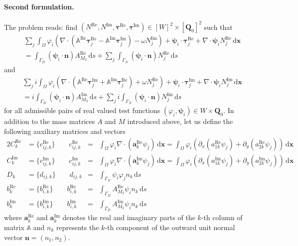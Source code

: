 \documentclass[11pt,a4paper]{article}
\begin{document}
\paragraph{Second formulation.} The problem reads: find $(N^\mathrm{Re},N^\mathrm{Im},\boldsymbol{\tau}^\mathrm{Re},\boldsymbol{\tau}^\mathrm{Im})\in [W]^2\times [\mathbf{Q}_0]^2$ such that
\begin{align}
&\sum_j\int_\Omega \varphi_i\left(\nabla\cdot(\mathbb{A}^\mathrm{Re}\boldsymbol{\tau}_j^\mathrm{Re}-\mathbb{A}^\mathrm{Im}\boldsymbol{\tau}_j^\mathrm{Im})-\omega N^\mathrm{Im}_j\right)+
\boldsymbol{\psi}_i\cdot\boldsymbol{\tau}^\mathrm{Re}_j+
\nabla\cdot\boldsymbol{\psi}_iN^\mathrm{Re}_j
\,\mathrm{d}\mathbf{x}\\
&=
\int_{\Gamma_D}(\boldsymbol{\psi}_i\cdot\mathbf{n})A^\mathrm{Re}_{M_2}\,\mathrm{d}s
+
\sum_j\int_{\Gamma_N}(\boldsymbol{\psi}_i\cdot\mathbf{n})N^\mathrm{Re}_j\,\mathrm{d}s
\end{align}
and
\begin{align}
&\sum_ji\int_\Omega \varphi_i\left(\nabla\cdot(\mathbb{A}^\mathrm{Re}\boldsymbol{\tau}_j^\mathrm{Im}+\mathbb{A}^\mathrm{Im}\boldsymbol{\tau}_j^\mathrm{Re})+\omega N^\mathrm{Re}_j\right)+
\boldsymbol{\psi}_i\cdot\boldsymbol{\tau}^\mathrm{Im}_j+
\nabla\cdot\boldsymbol{\psi}_iN^\mathrm{Im}_j
\,\mathrm{d}\mathbf{x}\\
&=
i\int_{\Gamma_D}(\boldsymbol{\psi}_i\cdot\mathbf{n})A^\mathrm{Im}_{M_2}\,\mathrm{d}s
+
\sum_ji\int_{\Gamma_N}(\boldsymbol{\psi}_i\cdot\mathbf{n})N^\mathrm{Im}_j\,\mathrm{d}s
\end{align}
for all admissible pairs of real valued test functions $(\varphi_i,\boldsymbol{\psi}_i)\in W\times\mathbf{Q}_0$.
In addition to the mass matrices $A$ and $M$ introduced above, let us define the following auxiliary matrices and vectors
\begin{alignat}{2}
C^\mathrm{Re}_k&=\{c^\mathrm{Re}_{ij,k}\} \qquad c^\mathrm{Re}_{ij,k}&=&
\int_\Omega \varphi_i\nabla\cdot(\mathbf{a}^\mathrm{Re}_k\psi_j)\,\mathrm{d}\mathbf{x}
=
\int_\Omega \varphi_i\left(\partial_x(a^\mathrm{Re}_{1k}\psi_j)+\partial_y(a^\mathrm{Re}_{2k}\psi_j)\right)\,\mathrm{d}\mathbf{x}\\
C^\mathrm{Im}_k&=\{c^\mathrm{Im}_{ij,k}\} \qquad c^\mathrm{Im}_{ij,k}&=&
\int_\Omega \varphi_i\nabla\cdot(\mathbf{a}^\mathrm{Im}_k\psi_j)\,\mathrm{d}\mathbf{x}
=
\int_\Omega \varphi_i\left(\partial_x(a^\mathrm{Im}_{1k}\psi_j)+\partial_y(a^\mathrm{Im}_{2k}\psi_j)\right)\,\mathrm{d}\mathbf{x}\\
D_k&=\{d_{ij,k}\} \qquad d_{ij,k}&=&
\int_{\Gamma_N}\psi_i\varphi_jn_k\,\mathrm{d}s\\
b^\mathrm{Re}_k&=\{b^\mathrm{Re}_{i,k}\} \qquad b^\mathrm{Re}_{i,k}&=&
\int_{\Gamma_D}A^\mathrm{Re}_{M_2}\psi_in_k\,\mathrm{d}s\\
b^\mathrm{Im}_k&=\{b^\mathrm{Im}_{i,k}\} \qquad b^\mathrm{Im}_{i,k}&=&
\int_{\Gamma_D}A^\mathrm{Im}_{M_2}\psi_in_k\,\mathrm{d}s
\end{alignat}
where $\mathbf{a}^\mathrm{Re}_k$ and $\mathbf{a}^\mathrm{Im}_k$ denotes the real and imaginary parts of the $k$-th column of matrix $\mathbb{A}$ and $n_k$ represents the $k$-th component of the outward unit normal vector $\mathbf{n}=(n_1,n_2)$. 
\end{document}
